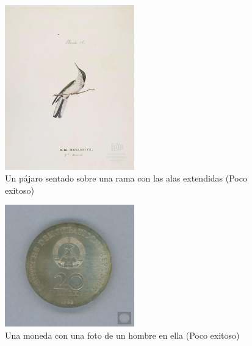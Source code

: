     \begin{figure}[h]
        \centering
        \includegraphics[width=0.5\textwidth]{Graphics/un pajaro sentado sobre una rama con las alas extendidas.jpg}
        \caption{Un pájaro sentado sobre una rama con las alas extendidas (Poco exitoso)}
    \end{figure}
    \begin{figure}[h]
        \centering
        \includegraphics[width=0.5\textwidth]{Graphics/una moneda con una foto de un hombre en ella.jpg}
        \caption{Una moneda con una foto de un hombre en ella (Poco exitoso)}
\end{figure}


